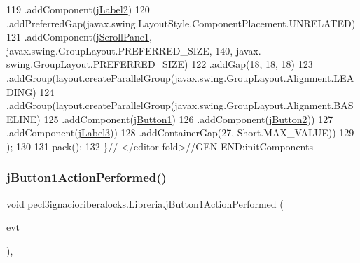 \begin{DoxyCode}
119                 .addComponent(\mbox{\hyperlink{classpecl3ignacioriberalocks_1_1_libreria_a8572be6fed6415a38a67dec66ee65efc}{jLabel2}})
120                 .addPreferredGap(javax.swing.LayoutStyle.ComponentPlacement.UNRELATED)
121                 .addComponent(\mbox{\hyperlink{classpecl3ignacioriberalocks_1_1_libreria_a1542942d7ab23017f40dfa5d553322c9}{jScrollPane1}}, javax.swing.GroupLayout.PREFERRED\_SIZE, 140, javax.
      swing.GroupLayout.PREFERRED\_SIZE)
122                 .addGap(18, 18, 18)
123                 .addGroup(layout.createParallelGroup(javax.swing.GroupLayout.Alignment.LEADING)
124                     .addGroup(layout.createParallelGroup(javax.swing.GroupLayout.Alignment.BASELINE)
125                         .addComponent(\mbox{\hyperlink{classpecl3ignacioriberalocks_1_1_libreria_aa1f6bf3a865167c265ce9c0c8baf8eca}{jButton1}})
126                         .addComponent(\mbox{\hyperlink{classpecl3ignacioriberalocks_1_1_libreria_acc9d4371c4ed2d11e66f0c90303d10a5}{jButton2}}))
127                     .addComponent(\mbox{\hyperlink{classpecl3ignacioriberalocks_1_1_libreria_a5f3330e2cc3fb9dc95566b31f55d24da}{jLabel3}}))
128                 .addContainerGap(27, Short.MAX\_VALUE))
129         );
130 
131         pack();
132     \}\textcolor{comment}{// </editor-fold>//GEN-END:initComponents}
\end{DoxyCode}
\mbox{\label{classpecl3ignacioriberalocks_1_1_libreria_a98cfec24b354efc41b40f054caaf0801}} 
\subsubsection{\texorpdfstring{j\+Button1\+Action\+Performed()}{jButton1ActionPerformed()}}
{\footnotesize\ttfamily void pecl3ignacioriberalocks.\+Libreria.\+j\+Button1\+Action\+Performed (\begin{DoxyParamCaption}\item[{java.\+awt.\+event.\+Action\+Event}]{evt }\end{DoxyParamCaption})\hspace{0.3cm}{\ttfamily [inline]}, {\ttfamily [private]}}


